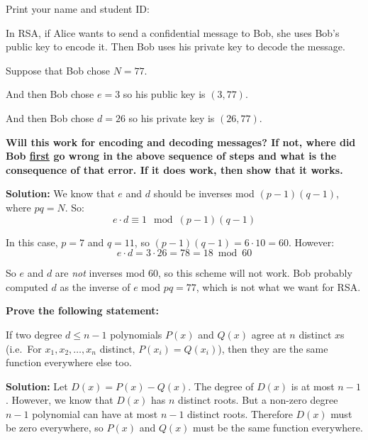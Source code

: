 \documentclass[11pt,fleqn]{article}
\newcommand{\fillin}[1]{\underline{\hskip #1}}
\newcommand{\startnewpage}{\newpage \noindent \vspace{0mm} {\sc Print} your name and student ID: \fillin{5in}\\[-0.2in]}
\renewcommand{\answer}[1]{{\color{mydarkblue}\textbf{Solution: }#1}}
\begin{document}
\begin{qunlist}

\startnewpage


In RSA, if Alice wants to send a confidential message to
Bob, she uses Bob's public key to encode it. Then Bob uses his
private key to decode the message. 

Suppose that Bob chose $N = 77$. 

And then Bob chose $e=3$ so his public key is $(3,77)$.

And then Bob chose $d=26$ so his private key is $(26,77)$. 

{\bf Will this work for encoding and decoding messages? If not, where did
Bob \underline{first} go wrong in the above sequence of steps and what is the
consequence of that error. If it does work, then show that it works.}

\answer{We know that $e$ and $d$ should be inverses mod $(p-1)(q-1)$, where $pq=N$. So:
\[ e\cdot d \equiv 1 \mod (p-1)(q-1) \]

In this case, $p=7$ and $q=11$, so $(p-1)(q-1) = 6 \cdot 10 = 60$. However:
\[ e \cdot d = 3 \cdot 26 = 78 = 18 \bmod 60 \]

So $e$ and $d$ are {\em not} inverses mod 60, so this scheme will not work. Bob probably computed $d$ as the inverse of $e$ mod $pq=77$, which is not what we want for RSA.
}
\vspace{1in}


{\bf Prove the following statement:}

If two degree $d \leq n-1$ polynomials $P(x)$ and $Q(x)$ agree at $n$
distinct $x$s (i.e.~For $x_1, x_2, \ldots, x_n$ distinct,
$P(x_i)=Q(x_i)$), then they are the same function everywhere else too.  

\answer{ Let $D(x) = P(x) - Q(x)$.  The degree of $D(x)$ is at most $n-1$. However, we know that $D(x)$ has $n$ distinct roots.  But a non-zero degree $n-1$ polynomial can have at most $n-1$ distinct roots.  Therefore $D(x)$ must be zero everywhere, so $P(x)$ and $Q(x)$ must be the same function everywhere.
}
\vspace{3in}




\end{qunlist}
\end{document}
